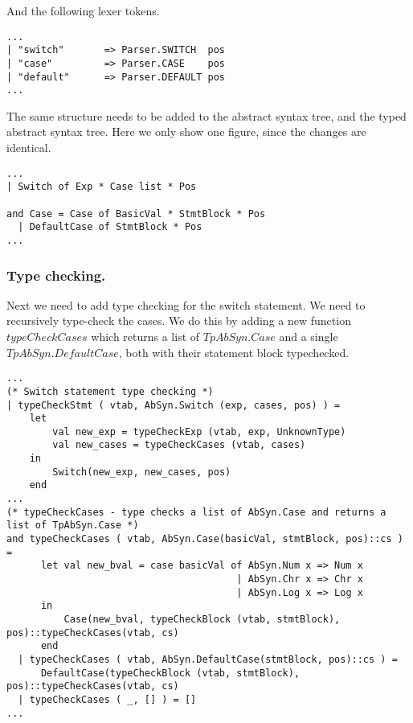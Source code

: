 \documentclass[12pt]{article}
\begin{document}
\noindent And the following lexer tokens.

\begin{lstlisting}[caption=Switch structure changes to Lexer.lex]
...
| "switch"       => Parser.SWITCH  pos
| "case"         => Parser.CASE    pos
| "default"      => Parser.DEFAULT pos
...
\end{lstlisting}

\noindent The same structure needs to be added to the abstract syntax tree, and the typed abstract syntax tree. Here we only show one figure, since the changes are identical.

\begin{lstlisting}[caption=Switch structure changes to AbSyn.sml and TpAbSyn.sml]
...
| Switch of Exp * Case list * Pos

and Case = Case of BasicVal * StmtBlock * Pos
  | DefaultCase of StmtBlock * Pos
...
\end{lstlisting}

\pagebreak

\subsubsection{Type checking.}

\noindent Next we need to add type checking for the switch statement. We need to recursively type-check the cases. We do this by adding a new function $typeCheckCases$ which returns a list of $TpAbSyn.Case$ and a single $TpAbSyn.DefaultCase$, both with their statement block typechecked.

\begin{lstlisting}[caption=Switch statement type checking in Type.sml]
...
(* Switch statement type checking *)
| typeCheckStmt ( vtab, AbSyn.Switch (exp, cases, pos) ) = 
    let 
        val new_exp = typeCheckExp (vtab, exp, UnknownType)
        val new_cases = typeCheckCases (vtab, cases)
    in
        Switch(new_exp, new_cases, pos)
    end
...
(* typeCheckCases - type checks a list of AbSyn.Case and returns a list of TpAbSyn.Case *)
and typeCheckCases ( vtab, AbSyn.Case(basicVal, stmtBlock, pos)::cs ) =
      let val new_bval = case basicVal of AbSyn.Num x => Num x
                                        | AbSyn.Chr x => Chr x
                                        | AbSyn.Log x => Log x
      in 
          Case(new_bval, typeCheckBlock (vtab, stmtBlock), pos)::typeCheckCases(vtab, cs) 
      end 
  | typeCheckCases ( vtab, AbSyn.DefaultCase(stmtBlock, pos)::cs ) =
      DefaultCase(typeCheckBlock (vtab, stmtBlock), pos)::typeCheckCases(vtab, cs) 
  | typeCheckCases ( _, [] ) = []
...
\end{lstlisting}
\end{document}
